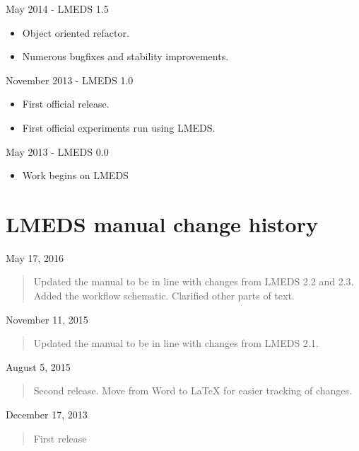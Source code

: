 May 2014 - LMEDS 1.5

\begin{itemize}
\item Object oriented refactor.
\item Numerous bugfixes and stability improvements.
\end{itemize}

November 2013 - LMEDS 1.0

\begin{itemize}
\item First official release.  
\item First official experiments run using LMEDS.
\end{itemize}

May 2013 - LMEDS 0.0

\begin{itemize}
\item Work begins on LMEDS
\end{itemize}


\section{LMEDS manual change history}

May 17, 2016

\begin{quote}
Updated the manual to be in line with changes from LMEDS 2.2 and 2.3.  Added the workflow schematic.  Clarified other parts of text.
\end{quote}

November 11, 2015

\begin{quote}
Updated the manual to be in line with changes from LMEDS 2.1.
\end{quote}

August 5, 2015

\begin{quote}
Second release.  Move from Word to LaTeX for easier tracking of changes.
\end{quote}

December 17, 2013


\begin{quote}
First release
\end{quote}


